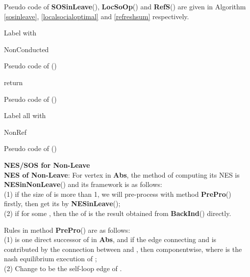 \documentclass{acm_proc_article-sp}
\begin{document}
Pseudo code of \textbf{SOSinLeave}(), \textbf{LocSoOp}() and \textbf{RefS}() are given in Algorithm \ref{sosinleave}, \ref{localsocialoptimal} and \ref{refreshsum} respectively.
\begin{algorithm}[!h]
\scriptsize
 Label  with \begin{bf}NonConducted\end{bf}\;
 \;
 \;
 \caption{Pseudo code of ()}
 \label{sosinleave}
\end{algorithm}
\begin{algorithm}[!h]
\scriptsize
 \KwData{}
 return \;
 \caption{Pseudo code of ()}
 \label{localsocialoptimal}
\end{algorithm}
\begin{algorithm}[!h]
\scriptsize
 \KwData{}
 \KwResult{}
 Label all  with \begin{bf}NonRef\end{bf}\;
 \caption{Pseudo code of ()}
 \label{refreshsum}
\end{algorithm}


\textbf{NES/SOS for Non-Leave}\\
\textbf{NES of Non-Leave}: For  vertex  in \textbf{Abs}, the method of computing its NES is \textbf{NESinNonLeave}() and its framework is as follows:\\
(1) if the size of  is more than 1, we will pre-process  with method \textbf{PrePro}() firstly, then get its  by \textbf{NESinLeave}();\\
(2) if  for some , then the  of  is the result obtained from \textbf{BackInd}() directly.

Rules in method \textbf{PrePro}() are as follows:\\
(1)  is one direct successor of  in \textbf{Abs}, and if the edge  connecting  and  is contributed by the connection between  and , then  componentwise, where  is the nash equilibrium execution of ;\\
(2) Change  to be the self-loop edge of .
\end{document}

